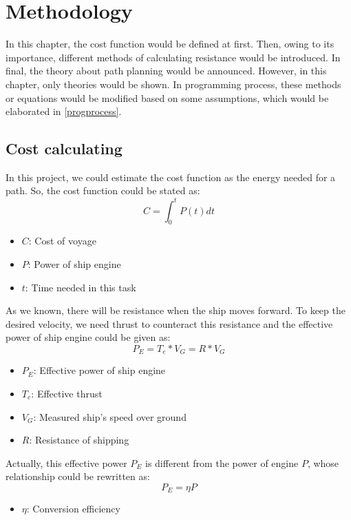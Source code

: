 \chapter{Methodology}
In this chapter, the cost function would be defined at first. Then, owing to its importance,  different methods of calculating resistance would be introduced. In final, the theory about path planning would be announced. However, in this chapter, only theories would be shown. In programming process, these methods or equations would be modified based on some assumptions, which would be elaborated in \autoref{progprocess}.
\section{Cost calculating}
In this project, we could estimate the cost function as the energy needed for a path. So, the cost function could be stated as:
\begin{equation}
    C=\int_{0}^{t} P(t) dt
    \label{cost fun}
\end{equation}
\begin{itemize}
    \item $C$: Cost of voyage
    \item $P$: Power of ship engine
    \item $t$: Time needed in this task
\end{itemize}
As we known, there will be resistance when the ship moves forward. To keep the desired velocity, we need thrust to counteract this resistance and the effective power of ship engine could be given as:
\begin{equation}
    P_{E}=T_{e}*V_{G}=R*V_{G}
    \label{ship power}
\end{equation}
\begin{itemize}
    \item $P_{E}$: Effective power of ship engine
    \item $T_{e}$: Effective thrust
    \item $V_{G}$: Measured ship's speed over ground
    \item $R$: Resistance of shipping
\end{itemize}
Actually, this effective power $P_{E}$ is different from the power of engine $P$, whose relationship could be rewritten as:
\begin{equation}
    P_{E}=\eta P
\end{equation}
\begin{itemize}
    \item $\eta$: Conversion efficiency
\end{itemize}
